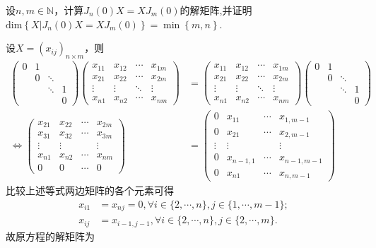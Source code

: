 \documentclass[../../main.tex]{subfiles}
\begin{document}
\begin{proposition}\label{proposition:与J_n(0)可交换的的矩阵}
设$n,m\in\mathbb{N}$，计算$J_n(0)X = XJ_m(0)$的解矩阵,并证明$\mathrm{dim}\left\{ X|J_n\left( 0 \right) X=XJ_m\left( 0 \right) \right\} =\min \left\{ m,n \right\}$.
\end{proposition}
\begin{solution}
设$X=(x_{ij})_{n\times m}$，则
\begin{align*}
\begin{pmatrix}
0 & 1 &  &  \\
 & 0 & \ddots &  \\
 &  & \ddots & 1 \\
 &  &  & 0
\end{pmatrix}
\begin{pmatrix}
x_{11} & x_{12} & \cdots & x_{1m} \\
x_{21} & x_{22} & \cdots & x_{2m} \\
\vdots & \vdots & \ddots & \vdots \\
x_{n1} & x_{n2} & \cdots & x_{nm}
\end{pmatrix}
&=
\begin{pmatrix}
x_{11} & x_{12} & \cdots & x_{1m} \\
x_{21} & x_{22} & \cdots & x_{2m} \\
\vdots & \vdots & \ddots & \vdots \\
x_{n1} & x_{n2} & \cdots & x_{nm}
\end{pmatrix}
\begin{pmatrix}
0 & 1 &  &  \\
 & 0 & \ddots &  \\
 &  & \ddots & 1 \\
 &  &  & 0
\end{pmatrix} \\
\Longleftrightarrow
\begin{pmatrix}
x_{21} & x_{22} & \cdots & x_{2m} \\
x_{31} & x_{32} & \cdots & x_{3m} \\
\vdots & \vdots &  & \vdots \\
x_{n1} & x_{n2} & \cdots & x_{nm} \\
0 & 0 & \cdots & 0
\end{pmatrix}
&=
\begin{pmatrix}
0 & x_{11} & \cdots & x_{1,m - 1} \\
0 & x_{21} & \cdots & x_{2,m - 1} \\
\vdots & \vdots &  & \vdots \\
0 & x_{n - 1,1} & \cdots & x_{n - 1,m - 1} \\
0 & x_{n1} & \cdots & x_{n,m - 1}
\end{pmatrix}
\end{align*}
比较上述等式两边矩阵的各个元素可得
\begin{align*}
x_{i1}&=x_{nj}=0, \forall i\in\{2,\cdots,n\}, j\in\{1,\cdots,m - 1\}; \\
x_{ij}&=x_{i - 1,j - 1}, \forall i\in\{2,\cdots,n\}, j\in\{2,\cdots,m\}.
\end{align*}
故原方程的解矩阵为


\end{solution}
\end{document}
